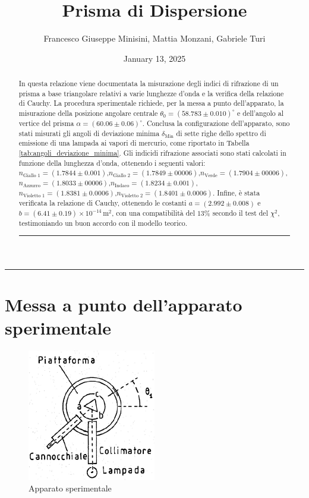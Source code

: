 \documentclass[a4paper,12pt]{article}
\title{Prisma di Dispersione}
\author{Francesco Giuseppe Minisini, Mattia Monzani, Gabriele Turi}
\date{January 13, 2025}
\begin{document}
\maketitle
\hrule
\vspace{9pt}
\begin{abstract}
\noindent
In questa relazione viene documentata la misurazione degli indici di rifrazione di un prisma a base triangolare relativi a varie lunghezze d'onda e la verifica della relazione di Cauchy. La procedura sperimentale richiede, per la messa a punto dell'apparato, la misurazione della posizione angolare centrale \(\theta_0 = (58.783 \pm 0.010)^\circ\) e dell'angolo al vertice del prisma \(\alpha = (60.06 \pm 0.06)^\circ\). Conclusa la configurazione dell'apparato, sono stati misurati gli angoli di deviazione minima \(\delta_{\text{Min}}\) di sette righe dello spettro di emissione di una lampada ai vapori di mercurio, come riportato in Tabella \ref{tab:angoli_deviazione_minima}. Gli indicidi rifrazione associati sono stati calcolati in funzione della lunghezza d'onda, ottenendo i seguenti valori: \(n_{\text{Giallo 1}} = (1.7844 \pm 0.001)\),\(n_{\text{Giallo 2}} = (1.7849 \pm 00006)\),\(n_{\text{Verde}} = (1.7904 \pm 00006)\),\(n_{\text{Azzurro}} = (1.8033 \pm 00006)\),\(n_{\text{Indaco}} = (1.8234 \pm 0.001)\),\(n_{\text{Violetto 1}} = (1.8381 \pm 0.0006)\),\(n_{\text{Violetto 2}} = (1.8401 \pm 0.0006)\).
Infine, è stata verificata la relazione di Cauchy, ottenendo le costanti \(a = (2.992 \pm 0.008)\) e \(b = (6.41 \pm 0.19) \times 10^{-14} \, \text{m}^2\), con una compatibilità del \(13\%\) secondo il test del \(\chi^2\), testimoniando un buon accordo con il modello teorico.
\vspace{20pt}
\hrule
\end{abstract}
\vspace{2 pt}

\section{Messa a punto dell'apparato sperimentale}

\begin{figure}[H]
    \centering
    \includegraphics[width=0.5\textwidth]{apparato.png}
    \caption{Apparato sperimentale}
    \label{fig:camera_millikan}
\end{figure}
\end{document}
